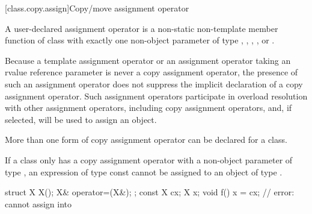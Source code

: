 [class.copy.assign]{Copy/move assignment operator}%

\pnum
{}%
%
%
%
%
%
%
A user-declared  assignment operator  is a
non-static non-template member function of class  with exactly one
non-object parameter of type , , ,
, or .
\begin{footnote}
Because
a template assignment operator or an assignment operator
taking an rvalue reference parameter is never a copy assignment operator,
the presence of such an assignment operator does not suppress the
implicit declaration of a copy assignment operator. Such assignment operators
participate in overload resolution with other assignment operators, including
copy assignment operators, and, if selected, will be used to assign an object.
\end{footnote}
\begin{note}
More than one form of copy assignment operator can be declared for a class.
\end{note}
\begin{note}
If a class
only has a copy assignment operator with a non-object parameter of type
,
an expression of type const
cannot be assigned to an object of type
.
\begin{example}
\begin{codeblock}
struct X {
  X();
  X& operator=(X&);
};
const X cx;
X x;
void f() {
  x = cx;           // error:  cannot assign  into 
}
\end{codeblock}
\end{example}
\end{note}

